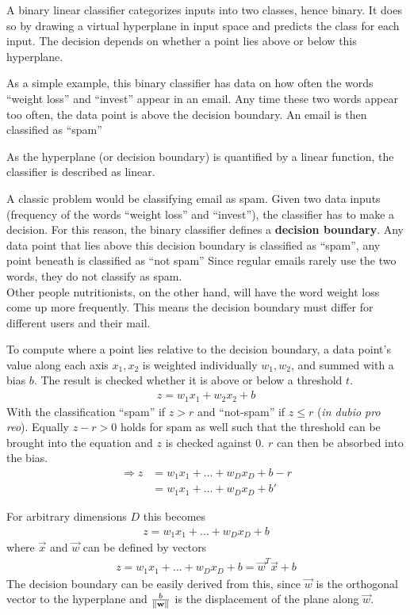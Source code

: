 A binary linear classifier categorizes inputs into two classes, hence binary.
It does so by drawing a virtual hyperplane in input space and predicts the class for each input.
The decision depends on whether a point lies above or below this hyperplane.
\begin{marginfigure}
    \resizebox{\textwidth}{!}{
        
    }
    \caption[]{As a simple example, this binary classifier has data on how often the words ``weight loss'' and ``invest'' appear in an email.
Any time these two words appear too often, the data point is above the decision boundary. An email is then classified as ``spam''}
\end{marginfigure}
As the hyperplane (or decision boundary) is quantified by a linear function, the classifier is described as linear.

A classic problem would be classifying email as spam.
Given two data inputs (\ie frequency of the words ``weight loss'' and ``invest''), the classifier has to make a decision.
For this reason, the binary classifier defines a \textbf{decision boundary}.
Any data point that lies above this decision boundary is classified as ``spam'', any point beneath is classified as ``not spam''
Since regular emails rarely use the two words, they do not classify as spam.\\
Other people \ie nutritionists, on the other hand, will have the word weight loss come up more frequently.
This means the decision boundary must differ for different users and their mail.

To compute where a point lies relative to the decision boundary, a data point's value along each axis $x_1, x_2$ is weighted individually $w_1, w_2$, and summed with a bias $b$.
The result is checked whether it is above or below a threshold $t$.
\begin{align}
    z = w_1 x_1 + w_2 x_2 + b
\end{align}
With the classification ``spam'' if $z > r$ and ``not-spam'' if $z \leq r$ (\textit{in dubio pro reo}).
Equally $z - r > 0$ holds for spam as well such that the threshold can be brought into the equation and $z$ is checked against $0$.
$r$ can then be absorbed into the bias.
\begin{align}
    \Rightarrow z & = w_1 x_1 + \hdots + w_D x_D + b - r \\
    & = w_1 x_1 + \hdots + w_D x_D + b'
\end{align}

For arbitrary dimensions $D$ this becomes
\begin{align}
    z = w_1 x_1 + \hdots + w_D x_D + b
\end{align}
 where $\vec{x}$ and $\vec{w}$ can be defined by vectors
\begin{align}
    z = w_1 x_1 + \hdots + w_D x_D + b = \vec{w}^T \vec{x} + b
\end{align}
The decision boundary can be easily derived from this, since $\vec{w}$ is the orthogonal vector to the hyperplane and $\frac{b}{\left\lVert\mathbf{w}\right\rVert}$ is the displacement of the plane along $\vec{w}$.

